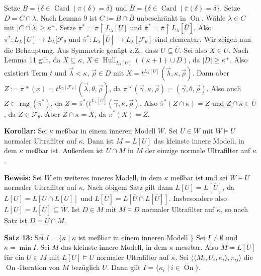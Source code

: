 \documentclass[a4paper,fontsize=11pt]{scrartcl}
\newcommand{\rng}{\operatorname{rng}}
\newcommand{\Card}{\operatorname{Card}}
\newcommand{\On}{\operatorname{On}}
\newcommand{\Hull}{\operatorname{Hull}}
\renewcommand{\bar}[1]{\overline{#1}}
\begin{document}
		Setze $B=\{\delta\in \Card\mid \pi(\delta)=\delta\}$ und $\bar B=\{\delta\in\Card\mid \bar\pi(\delta)=\delta\}$.
		Setze $D=C\cap\lambda$.
		Nach Lemma 9 ist $C:= B\cap\bar B$ unbeschränkt in $\On$.
		Wähle $\lambda\in C$ mit $|C\cap\lambda|\ge\kappa^+$.
		Setze $\pi^*=\pi\upharpoonright L_{\lambda}[U]$ und $\bar\pi^* = \bar\pi\upharpoonright L_{\lambda}[\bar U]$.
		Also $\pi^*\colon L_{\lambda}[U]\to L_{\lambda}[\mathcal F_{\theta}$ und $\bar\pi^*\colon L_{\lambda}[\bar U]\to L_{\lambda}[\mathcal F_{\theta}]$ sind elementar.
		Wir zeigen nun die Behauptung.
		Aus Symmetrie genügt z.Z., dass $U\subseteq\bar U$.
		Sei also $X\in U$.
		Nach Lemma 11 gilt, da $X\subseteq\kappa$, $X\in\Hull_{L_{\lambda}[U]}((\kappa+1)\cup D)$, da $|D|\ge\kappa^+$.
		Also existiert Term $t$ und $\vec\lambda<\kappa$, $\vec\rho\in D$ mit $X=t^{L_{\lambda}[U]}(\vec\lambda,\kappa,\vec\rho)$.
		Dann aber $Z:=\pi*(x)=t^{L_{\lambda}[\mathcal F_{\theta}]}(\vec\lambda,\theta, \vec\rho)$, da $\pi*(\vec\gamma,\kappa,\vec\rho)=(\vec\gamma,\theta,\vec\rho)$.
		Also auch $Z\in\rng(\bar\pi^*)$, da $Z=\bar\pi^*(t^{L_{\lambda}[\bar U]}(\vec\gamma,\kappa,\vec\rho)$.
		Also $\bar\pi^*(Z\cap\kappa)=Z$ und $Z\cap\kappa\in\bar U$, da $Z\in\mathcal F_{\theta}$.
		Aber $Z\cap\kappa=X$, da $\pi^*(X)=Z$.

{\bf Korollar:} Sei $\kappa$ meßbar in einem inneren Modell $W$.
	Sei $U\in W$ mit $W\models U$ normaler Ultrafilter auf $\kappa$.
	Dann ist $M=L[U]$ das kleinste innere Modell, in dem $\kappa$ meßbar ist.
	Außerdem ist $U\cap M$ in $M$ der einzige normale Ultrafilter auf $\kappa$.

	{\bf Beweis:} Sei $\bar W$ ein weiteres inneres Modell, in dem $\kappa$ meßbar ist und sei $\bar W\models\bar U$ normaler Ultrafilter auf $\kappa$.
		Nach obigem Satz gilt dann $L[U]=L[\bar U]$, da $L[U]=L[U\cap L[U]]$ und $L[\bar U]=L[\bar U\cap L[\bar U]]$.
		Insbesondere also $L[U]=L[\bar U]\subseteq\bar W$.
		Ist $D\in M$ mit $M\models D$ normaler Ultrafilter auf $\kappa$, so nach Satz ist $D=U\cap M$.

{\bf Satz 13:} Sei $I=\{\kappa\mid\kappa$ ist meßbar in einem inneren Modell $\}$
	Sei $I\neq\emptyset$ und $\kappa=\min I$.
	Sei $M$ das kleinste innere Modell, in dem $\kappa$ messbar.
	Also $M=L[U]$ für ein $U\in M$ mit $L[U]\models U$ normaler Ultrafilter auf $\kappa$.
	Sei $\langle\langle M_i, U_i, \kappa_i\rangle,\pi_{ij}\rangle$ die $\On$-Iteration von $M$ bezüglich $U$.
	Dann gilt $I=\{\kappa_i\mid i\in\On\}$.
\end{document}
